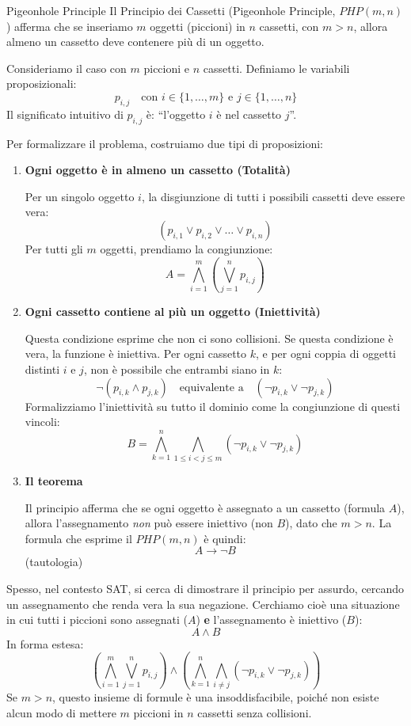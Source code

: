 \documentclass[a4paper,11pt]{report}
\begin{document}
\begin{gframe}{Pigeonhole Principle}
Il Principio dei Cassetti (Pigeonhole Principle, \( PHP(m, n) \)) afferma che se inseriamo \( m \) oggetti (piccioni) in \( n \) cassetti, con \( m > n \), allora almeno un cassetto deve contenere più di un oggetto.

Consideriamo il caso con \( m \) piccioni e \( n \) cassetti.
Definiamo le variabili proposizionali:
\[ p_{i,j} \quad \text{con } i \in \{1, \dots, m\} \text{ e } j \in \{1, \dots, n\} \]
Il significato intuitivo di \( p_{i,j} \) è: ``l'oggetto \( i \) è nel cassetto \( j \)''.

Per formalizzare il problema, costruiamo due tipi di proposizioni:

\begin{enumerate}
    \item \textbf{Ogni oggetto è in almeno un cassetto (Totalità)}

        Per un singolo oggetto \( i \), la disgiunzione di tutti i possibili cassetti deve essere vera:
\[ (p_{i,1} \lor p_{i,2} \lor \dots \lor p_{i,n}) \]
Per tutti gli \( m \) oggetti, prendiamo la congiunzione:
\[ A = \bigwedge_{i=1}^{m} \left( \bigvee_{j=1}^{n} p_{i,j} \right) \]


\item \textbf{Ogni cassetto contiene al più un oggetto (Iniettività)}

    Questa condizione esprime che non ci sono collisioni. Se questa condizione è vera, la funzione è iniettiva.
Per ogni cassetto \( k \), e per ogni coppia di oggetti distinti \( i \) e \( j \), non è possibile che entrambi siano in \( k \):
\[ \neg(p_{i,k} \land p_{j,k}) \quad \text{equivalente a} \quad (\neg p_{i,k} \lor \neg p_{j,k}) \]
Formalizziamo l'iniettività su tutto il dominio come la congiunzione di questi vincoli:
\[ B = \bigwedge_{k=1}^{n} \bigwedge_{1 \le i < j \le m} (\neg p_{i,k} \lor \neg p_{j,k}) \]


\item \textbf{Il teorema}

Il principio afferma che se ogni oggetto è assegnato a un cassetto (formula \( A \)), allora l'assegnamento \textit{non} può essere iniettivo (non \( B \)), dato che \( m > n \).
La formula che esprime il \( PHP(m, n) \) è quindi:
\[ A \to \neg B \]
(tautologia)

\end{enumerate}

Spesso, nel contesto SAT, si cerca di dimostrare il principio per assurdo, cercando un assegnamento che renda vera la sua negazione. Cerchiamo cioè una situazione in cui tutti i piccioni sono assegnati (\( A \)) \textbf{e} l'assegnamento è iniettivo (\( B \)):
\[ A \land B \]
In forma estesa:
\[ \left( \bigwedge_{i=1}^{m} \bigvee_{j=1}^{n} p_{i,j} \right) \land \left( \bigwedge_{k=1}^{n} \bigwedge_{i \neq j} (\neg p_{i,k} \lor \neg p_{j,k}) \right) \]
Se \( m > n \), questo insieme di formule è una  insoddisfacibile, poiché non esiste alcun modo di mettere \( m \) piccioni in \( n \) cassetti senza collisioni.
\end{gframe}
\end{document}
